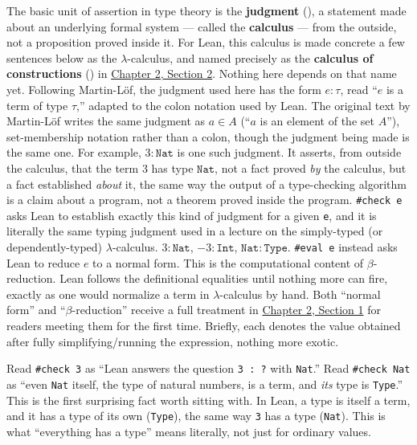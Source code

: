 \begin{mathreading}

The basic unit of assertion in type theory is the \textbf{judgment} (\cite{MartinLof1984}), a statement made about an underlying formal system --- called the \textbf{calculus} --- from the outside, not a proposition proved inside it. For Lean, this calculus is made concrete a few sentences below as the \(\lambda\)-calculus, and named precisely as the \textbf{calculus of constructions} (\cite{CoquandHuet1988}) in \hyperref[sec:02-terminology-and-coc:02-pi-sigma-and-coc:1]{Chapter 2, Section 2}. Nothing here depends on that name yet. Following Martin-Löf, the judgment used here has the form \(e : \tau\), read ``\(e\) is a term of type \(\tau\),'' adapted to the colon notation used by Lean. The original text by Martin-Löf writes the same judgment as \(a \in A\) (``\(a\) is an element of the set \(A\)''), set-membership notation rather than a colon, though the judgment being made is the same one. For example, \(3 : \mathtt{Nat}\) is one such judgment. It asserts, from outside the calculus, that the term \(3\) has type \(\mathtt{Nat}\), not a fact proved \emph{by} the calculus, but a fact established \emph{about} it, the same way the output of a type-checking algorithm is a claim about a program, not a theorem proved inside the program. \texttt{\#check e} asks Lean to establish exactly this kind of judgment for a given \texttt{e}, and it is literally the same typing judgment used in a lecture on the simply-typed (or dependently-typed) \(\lambda\)-calculus. \(3 : \mathtt{Nat}\), \({-3} : \mathtt{Int}\), \(\mathtt{Nat} : \mathtt{Type}\). \texttt{\#eval e} instead asks Lean to reduce \(e\) to a normal form. This is the computational content of \(\beta\)-reduction. Lean follows the definitional equalities until nothing more can fire, exactly as one would normalize a term in \(\lambda\)-calculus by hand. Both ``normal form'' and ``\(\beta\)-reduction'' receive a full treatment in \hyperref[sec:02-terminology-and-coc:01-terminology:1]{Chapter 2, Section 1} for readers meeting them for the first time. Briefly, each denotes the value obtained after fully simplifying/running the expression, nothing more exotic.

\end{mathreading}

Read \texttt{\#check 3} as ``Lean answers the question \texttt{3 : ?} with \texttt{Nat}.'' Read \texttt{\#check Nat} as ``even \texttt{Nat} itself, the type of natural numbers, is a term, and \emph{its} type is \texttt{Type}.'' This is the first surprising fact worth sitting with. In Lean, a type is itself a term, and it has a type of its own (\texttt{Type}), the same way \texttt{3} has a type (\texttt{Nat}). This is what ``everything has a type'' means literally, not just for ordinary values.

